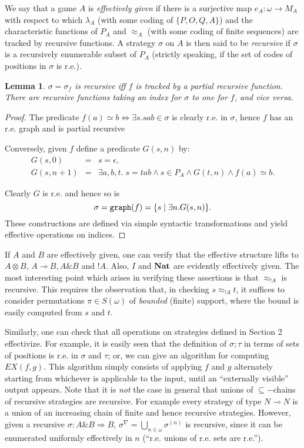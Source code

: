 \documentclass[11pt]{article}
\newtheorem{lemma}[theorem]{Lemma}
\newcommand{\Nat}{{\bf Nat}}
\newcommand{\with}{\mbox{$\&$}}
\newcommand{\tensor}{\mbox{$\otimes$}}
\newcommand{\linimpl}{\mbox{$\multimap$}}
\begin{document}
We say that a game $A$ is {\em effectively given} if there is a surjective map
$e_A:\omega \rightarrow M_A$ with respect to which $\lambda_A$ (with some
coding of $\{P,O,Q,A\}$) and the characteristic functions of $P_A$ and
$\approx_A$ (with some coding of finite sequences) are tracked by recursive
functions. A strategy $\sigma$ on $A$ is then said to be {\em recursive}
if $\sigma$ is a recursively enumerable subset of $P_A$
(strictly speaking, if the set of codes of positions in $\sigma$ is r.e.).

\begin{lemma}\label{uni.1}
$\sigma=\sigma_f$ is recursive iff $f$ is tracked by a partial recursive
function. There are recursive functions taking an index for $\sigma$ to
one for $f$, and vice versa.
\end{lemma}
\begin{proof} The predicate $f(a)\simeq b\Leftrightarrow \exists s.
sab\in\sigma$ is clearly r.e. in $\sigma$, hence $f$ has an r.e.
graph and is partial recursive

Conversely, given $f$ define  a predicate $G(s,n)$ by:
\[ \begin{array}{lcl}
G(s,0) & = & s=\epsilon ,\\
G(s,n+1) &=& \exists a,b,t. \; s=tab\wedge s\in P_A\wedge G(t,n)\wedge
f(a)\simeq b.
\end{array} \]

Clearly $G$ is r.e. and hence so is $$\sigma={\tt graph}(f)=\{ s
\mid \exists n. G(s,n)\}. $$ These constructions are defined via
simple syntactic transformations and yield effective operations on
indices. \end{proof}

If $A$ and $B$ are effectively given, one can verify that the effective
structure lifts to $A\tensor B$, $A\linimpl B, A\with B$ and $!A$. Also,
$I$ and $\Nat$ are evidently effectively given. The most interesting point
which arises in verifying these assertions is that $\approx_{!A}$ is
recursive. This requires the observation that, in checking $s\approx_{!A} t$,
it suffices to consider permutations $\pi\in S(\omega)$ of {\em bounded}
(finite) support, where the bound is easily computed from $s$ and $t$.

Similarly, one can check that all operations on strategies defined in
Section 2 effectivize. For example, it is easily seen that the definition of
$\sigma;\tau$ in terms of sets of positions is r.e. in $\sigma$ and $\tau$;
or, we can give an algorithm for computing $EX(f,g)$. This algorithm
simply consists of applying $f$ and $g$ alternately starting from
whichever is applicable to the input, until an ``externally visible'' output
appears. Note that it is {\sl not} the case in general that unions of
$\subseteq-$chains of recursive strategies are recursive. For example every
strategy of type $N\linimpl N$ is a union of an increasing chain of finite
and hence recursive strategies. However, given a recursive
$\sigma: A\with B\Rightarrow B$, $\sigma^{\nabla}=\bigcup_{n\in\omega}
\sigma^{(n)}$ is recursive, since it can be enumerated uniformly effectively
in $n$ (``r.e. unions of r.e. sets are r.e.'').
\end{document}

